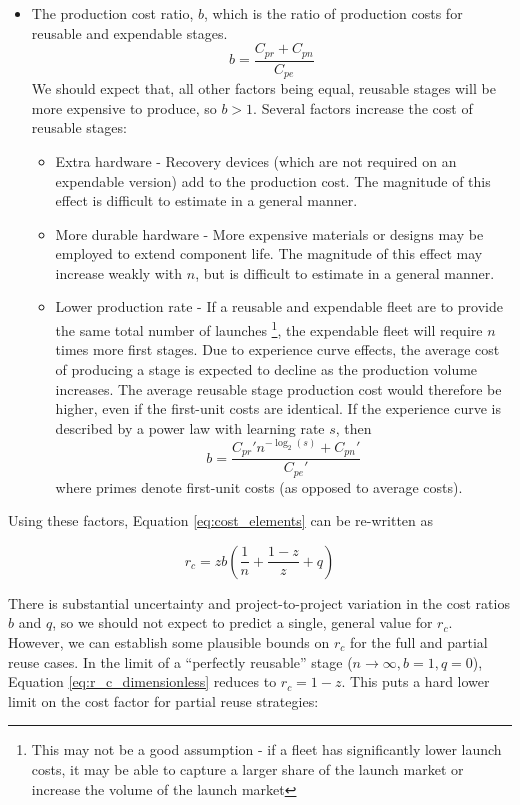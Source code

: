 \documentclass[conf]{new-aiaa}
\begin{document}
\begin{itemize}
    \item The production cost ratio, $b$, which is the ratio of production costs for reusable and expendable stages.
    \begin{equation}
    b = \frac{C_{pr} + C_{pn}}{C_{pe}}
    \end{equation}
    We should expect that, all other factors being equal, reusable stages will be more expensive to produce, so $b>1$. Several factors increase the cost of reusable stages:
    \begin{itemize}
    	\item Extra hardware - Recovery devices (which are not required on an expendable version) add to the production cost. The magnitude of this effect is difficult to estimate in a general manner.
    	\item More durable hardware - More expensive materials or designs may be employed to extend component life. The magnitude of this effect may increase weakly with $n$, but is  difficult to estimate in a general manner.
    	\item Lower production rate - If a reusable and expendable fleet are to provide the same total number of launches \footnote{This may not be a good assumption - if a fleet has significantly lower launch costs, it may be able to capture a larger share of the launch market or increase the volume of the launch market}, the expendable fleet will require $n$ times more first stages. Due to experience curve effects, the average cost of producing a stage is expected to decline as the production volume increases. The average reusable stage production cost would therefore be higher, even if the first-unit costs are identical. If the experience curve is described by a power law with learning rate $s$, then
    	\begin{equation}
    	b = \frac{C_{pr}' n^{-\log_2(s)} + C_{pn}'}{C_{pe}'}
    	\end{equation}
    	where primes denote first-unit costs (as opposed to average costs).
    \end{itemize}
\end{itemize}

Using these factors, Equation \ref{eq:cost_elements} can be re-written as

\begin{equation}
\label{eq:r_c_dimensionless}
r_c = z b \left( \frac{1}{n} + \frac{1 - z}{z} + q \right)
\end{equation}

There is substantial uncertainty and project-to-project variation in the cost ratios $b$ and $q$, so we should not expect to predict a single, general value for $r_c$. However, we can establish some plausible bounds on $r_c$ for the full and partial reuse cases. In the limit of a ``perfectly reusable'' stage ($n\rightarrow\infty, b=1, q=0$), Equation \ref{eq:r_c_dimensionless} reduces to $r_c = 1 - z$. This puts a hard lower limit on the cost factor for partial reuse strategies:
\end{document}
